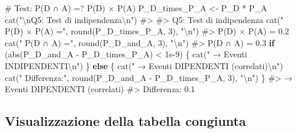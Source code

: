 \documentclass[
  letterpaper,
  DIV=11,
  numbers=noendperiod,
  oneside]{scrreprt}
\newenvironment{Shaded}{\begin{snugshade}}{\end{snugshade}}
\newcommand{\CommentTok}[1]{\textcolor[rgb]{0.37,0.37,0.37}{#1}}
\newcommand{\ControlFlowTok}[1]{\textcolor[rgb]{0.00,0.23,0.31}{\textbf{#1}}}
\newcommand{\DecValTok}[1]{\textcolor[rgb]{0.68,0.00,0.00}{#1}}
\newcommand{\FloatTok}[1]{\textcolor[rgb]{0.68,0.00,0.00}{#1}}
\newcommand{\FunctionTok}[1]{\textcolor[rgb]{0.28,0.35,0.67}{#1}}
\newcommand{\NormalTok}[1]{\textcolor[rgb]{0.00,0.23,0.31}{#1}}
\newcommand{\OtherTok}[1]{\textcolor[rgb]{0.00,0.23,0.31}{#1}}
\newcommand{\SpecialCharTok}[1]{\textcolor[rgb]{0.37,0.37,0.37}{#1}}
\newcommand{\StringTok}[1]{\textcolor[rgb]{0.13,0.47,0.30}{#1}}
\theoremstyle{definition}
\theoremstyle{plain}
\theoremstyle{definition}
\theoremstyle{remark}
\begin{document}
\begin{Shaded}
\begin{Highlighting}[]
\CommentTok{\# Test: P(D ∩ A) =? P(D) × P(A)}
\NormalTok{P\_D\_times\_P\_A }\OtherTok{\textless{}{-}}\NormalTok{ P\_D }\SpecialCharTok{*}\NormalTok{ P\_A}
\FunctionTok{cat}\NormalTok{(}\StringTok{"}\SpecialCharTok{\textbackslash{}n}\StringTok{Q5: Test di indipendenza}\SpecialCharTok{\textbackslash{}n}\StringTok{"}\NormalTok{)}
\CommentTok{\#\textgreater{} }
\CommentTok{\#\textgreater{} Q5: Test di indipendenza}
\FunctionTok{cat}\NormalTok{(}\StringTok{"  P(D) × P(A) ="}\NormalTok{, }\FunctionTok{round}\NormalTok{(P\_D\_times\_P\_A, }\DecValTok{3}\NormalTok{), }\StringTok{"}\SpecialCharTok{\textbackslash{}n}\StringTok{"}\NormalTok{)}
\CommentTok{\#\textgreater{}   P(D) × P(A) = 0.2}
\FunctionTok{cat}\NormalTok{(}\StringTok{"  P(D ∩ A) ="}\NormalTok{, }\FunctionTok{round}\NormalTok{(P\_D\_and\_A, }\DecValTok{3}\NormalTok{), }\StringTok{"}\SpecialCharTok{\textbackslash{}n}\StringTok{"}\NormalTok{)}
\CommentTok{\#\textgreater{}   P(D ∩ A) = 0.3}
\ControlFlowTok{if}\NormalTok{ (}\FunctionTok{abs}\NormalTok{(P\_D\_and\_A }\SpecialCharTok{{-}}\NormalTok{ P\_D\_times\_P\_A) }\SpecialCharTok{\textless{}} \FloatTok{1e{-}9}\NormalTok{) \{}
  \FunctionTok{cat}\NormalTok{(}\StringTok{"  → Eventi INDIPENDENTI}\SpecialCharTok{\textbackslash{}n}\StringTok{"}\NormalTok{)}
\NormalTok{\} }\ControlFlowTok{else}\NormalTok{ \{}
  \FunctionTok{cat}\NormalTok{(}\StringTok{"  → Eventi DIPENDENTI (correlati)}\SpecialCharTok{\textbackslash{}n}\StringTok{"}\NormalTok{)}
  \FunctionTok{cat}\NormalTok{(}\StringTok{"  Differenza:"}\NormalTok{, }\FunctionTok{round}\NormalTok{(P\_D\_and\_A }\SpecialCharTok{{-}}\NormalTok{ P\_D\_times\_P\_A, }\DecValTok{3}\NormalTok{), }\StringTok{"}\SpecialCharTok{\textbackslash{}n}\StringTok{"}\NormalTok{)}
\NormalTok{\}}
\CommentTok{\#\textgreater{}   → Eventi DIPENDENTI (correlati)}
\CommentTok{\#\textgreater{}   Differenza: 0.1}
\end{Highlighting}
\end{Shaded}

\subsection{Visualizzazione della tabella
congiunta}\label{visualizzazione-della-tabella-congiunta-1}
\end{document}
